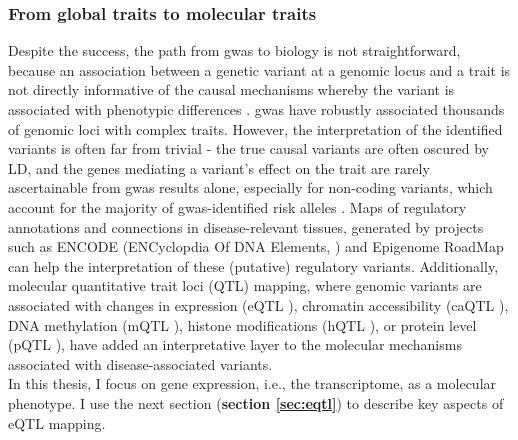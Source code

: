 
\subsubsection{From global traits to molecular traits}

Despite the success,
the path from \gls{gwas} to biology is not straightforward, because an association between a genetic variant at a genomic locus and a trait is not directly informative of the causal mechanisms whereby the variant is associated with phenotypic differences \cite{visscher201710}. 
\gls{gwas} have robustly associated thousands of genomic loci with complex traits. 
However, the interpretation of the identified variants is often far from trivial - the true causal variants are often oscured by LD, and the genes mediating a variant's effect on the trait are rarely ascertainable from \gls{gwas} results alone, especially for non-coding variants, which account for the majority of \gls{gwas}-identified risk alleles \cite{manolio2009finding, gallagher2018post, wainberg2019opportunities}. 
Maps of regulatory annotations and connections in disease-relevant tissues, generated by projects such as ENCODE (ENCyclopdia Of DNA Elements, \cite{encode2004encode}) and Epigenome RoadMap \cite{kundaje2015integrative} can help the interpretation of these (putative) regulatory variants.
Additionally, molecular quantitative trait loci (QTL) mapping, where genomic variants are associated with changes in expression (eQTL \cite{schadt2003genetics}), chromatin accessibility (caQTL \cite{degner2012dnase}), DNA methylation (mQTL \cite{gaunt2016systematic}), histone modifications (hQTL \cite{grubert2015genetic}), or  protein level (pQTL \cite{melzer2008genome}), have added an interpretative layer to the molecular mechanisms associated with disease-associated variants.
\\

In this thesis, I focus on gene expression, i.e., the transcriptome, as a molecular phenotype.
I use the next section (\textbf{section \ref{sec:eqtl}}) to describe key aspects of eQTL mapping.


